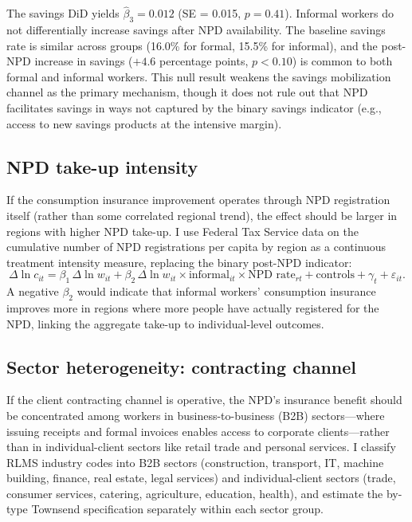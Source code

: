\documentclass[12pt]{article}
\begin{document}
The savings DiD yields $\hat{\beta}_3 = 0.012$ (SE = 0.015, $p = 0.41$). Informal workers do not differentially increase savings after NPD availability. The baseline savings rate is similar across groups (16.0\% for formal, 15.5\% for informal), and the post-NPD increase in savings ($+4.6$ percentage points, $p < 0.10$) is common to both formal and informal workers. This null result weakens the savings mobilization channel as the primary mechanism, though it does not rule out that NPD facilitates savings in ways not captured by the binary savings indicator (e.g., access to new savings products at the intensive margin).

\subsection{NPD take-up intensity}

If the consumption insurance improvement operates through NPD registration itself (rather than some correlated regional trend), the effect should be larger in regions with higher NPD take-up. I use Federal Tax Service data on the cumulative number of NPD registrations per capita by region as a continuous treatment intensity measure, replacing the binary post-NPD indicator:
\begin{equation}\label{eq:intensity}
\Delta \ln c_{it} = \beta_1 \, \Delta \ln w_{it} + \beta_2 \, \Delta \ln w_{it} \times \text{informal}_{it} \times \text{NPD rate}_{rt} + \text{controls} + \gamma_t + \varepsilon_{it}.
\end{equation}
A negative $\beta_2$ would indicate that informal workers' consumption insurance improves more in regions where more people have actually registered for the NPD, linking the aggregate take-up to individual-level outcomes.

\subsection{Sector heterogeneity: contracting channel}

If the client contracting channel is operative, the NPD's insurance benefit should be concentrated among workers in business-to-business (B2B) sectors---where issuing receipts and formal invoices enables access to corporate clients---rather than in individual-client sectors like retail trade and personal services. I classify RLMS industry codes into B2B sectors (construction, transport, IT, machine building, finance, real estate, legal services) and individual-client sectors (trade, consumer services, catering, agriculture, education, health), and estimate the by-type Townsend specification separately within each sector group.
\end{document}
